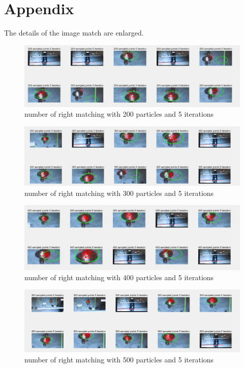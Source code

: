 \section{Appendix}

The details of the image match are enlarged.

\begin{figure}[H]
\centering%
\includegraphics[width=5in]{200n5icompare.jpg}
\caption{number of right matching with 200 particles and 5 iterations}
\label{Fig.3}
\end{figure}

\begin{figure}[H]
\centering%
\includegraphics[width=5in]{300n5icompare.jpg}
\caption{number of right matching with 300 particles and 5 iterations}
\label{Fig.4}
\end{figure}


\begin{figure}[H]
\centering%
\includegraphics[width=5in]{400n5icompare.jpg}
\caption{number of right matching with 400 particles and 5 iterations}
\label{Fig.5}
\end{figure}


\begin{figure}[H]
\centering%
\includegraphics[width=5in]{500n5icompare.jpg}
\caption{number of right matching with 500 particles and 5 iterations}
\label{Fig.6}
\end{figure}


